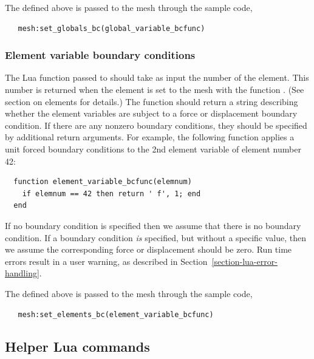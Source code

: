 The  defined above is passed to the mesh 
through the sample code,
\begin{verbatim}
   mesh:set_globals_bc(global_variable_bcfunc)
\end{verbatim}

\subsubsection{Element variable boundary conditions}
The Lua function passed to  should take as input the
number of the element. This number is returned when the element 
is set to the mesh with the function .
(See section on elements for details.)
The function should return a string describing whether the element variables
are subject to a force or displacement boundary condition.  If there are
any nonzero boundary conditions, they should be specified by
additional return arguments.  For example, the following function
applies a unit forced boundary conditions to the 2nd element variable
of element number 42:
\begin{verbatim}
  function element_variable_bcfunc(elemnum)
    if elemnum == 42 then return ' f', 1; end
  end
\end{verbatim}
If no boundary condition is specified then we assume that there 
is no boundary condition.
If a boundary condition \emph{is} specified, but without a specific
value, then we assume the corresponding force or displacement should
be zero.  Run time errors result in a user warning, as described in
Section~\ref{section-lua-error-handling}.

The  defined above is passed to the mesh 
through the sample code,
\begin{verbatim}
   mesh:set_elements_bc(element_variable_bcfunc)
\end{verbatim}

\subsection{Helper Lua commands}
